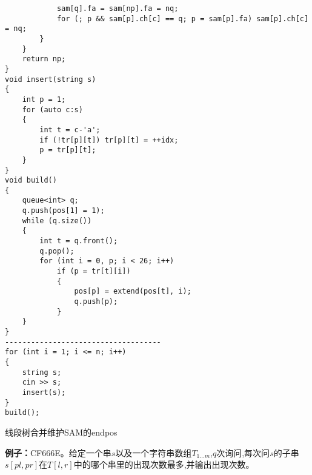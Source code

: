 \documentclass[a4paper, fontset=none]{ctexart}
\begin{document}
\begin{verbatim}
            sam[q].fa = sam[np].fa = nq;
            for (; p && sam[p].ch[c] == q; p = sam[p].fa) sam[p].ch[c] = nq;
        }
    }
    return np;
}
void insert(string s)
{
    int p = 1;
    for (auto c:s)
    {
        int t = c-'a';
        if (!tr[p][t]) tr[p][t] = ++idx;
        p = tr[p][t];
    }
}
void build()
{
    queue<int> q;
    q.push(pos[1] = 1);
    while (q.size())
    {
        int t = q.front();
        q.pop();
        for (int i = 0, p; i < 26; i++)
            if (p = tr[t][i])
            {
                pos[p] = extend(pos[t], i);
                q.push(p);
            }
    }
}
------------------------------------
for (int i = 1; i <= n; i++)
{
    string s;
    cin >> s;
    insert(s);
}
build();
\end{verbatim}

线段树合并维护SAM的endpos

\textbf{例子：}CF666E。给定一个串$s$以及一个字符串数组$T_{1\ldots m}$,$q$次询问,每次问$s$的子串$s[pl, pr]$在$T[l, r]$中的哪个串里的出现次数最多,并输出出现次数。
\end{document}
